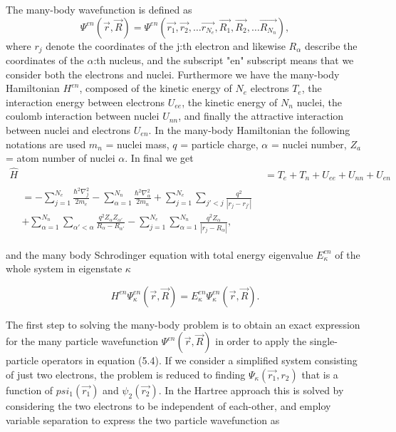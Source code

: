 The many-body wavefunction is defined as
\begin{equation}
\Psi^{en}(\vec{r}, \vec{R}) = \Psi^{en}(\vec{r_1}, \vec{r_2}, \dots \vec{r_{N_e}}, \vec{R_1}, \vec{R_2}, \dots \vec{R_{N_n}}),
\end{equation}
 where $r_j$ denote the coordinates of the j:th electron and likewise $R_{\alpha}$ describe the coordinates of the $\alpha$:th nucleus, and the subscript "en" subscript means that we consider both the electrons and nuclei. Furthermore we have the many-body Hamiltonian $H^{en}$, composed of the kinetic energy of $N_e$ electrons $T_e$, the interaction energy between electrons $U_{ee}$, the kinetic energy of $N_n$ nuclei, the coulomb interaction between nuclei $U_{nn}$, and finally the attractive interaction between nuclei and electrons $U_{en}$. In the many-body Hamiltonian the following notations are used $m_n$ = nuclei mass, $q$ = particle charge, $\alpha$ = nuclei number, $Z_a$ = atom number of nuclei $\alpha$. In final we get 
\begin{align}
    \hat{H} &= T_e + T_n + U_{ee} + U_{nn} + U_{en} \\
    \begin{split}
        &= -\sum_{j=1}^{N_e}\frac{\hbar^2\nabla_j ^2}{2m_e} - \sum_{\alpha=1}^{N_n}\frac{\hbar^2 \nabla_\alpha ^2}{2m_n} + \sum_{j=1}^{N_e}\sum_{j'<j}\frac{q^2}{|r_j - r_{j'}|} \\
    &+ \sum_{\alpha=1}^{N_n}\sum_{\alpha' < \alpha}\frac{q^2Z_\alpha Z_{\alpha'}}{R_\alpha - R_{\alpha'}} -\sum_{j=1}^{N_e}\sum_{\alpha=1}^{N_n}\frac{q^2Z_\alpha}{|r_j - R_\alpha|},
    \end{split}
\end{align} 
 
and the many body Schrodinger equation with total energy eigenvalue $E_{\kappa}^{en}$ of the whole system in eigenstate $\kappa$
 
\begin{equation}
H^{en}\Psi^{en}_{\kappa}(\vec{r}, \vec{R}) = E_{\kappa}^{en}\Psi_{\kappa}^{en}(\vec{r}, \vec{R}).
\end{equation}

The first step to solving the many-body problem is to obtain an exact expression for the many particle wavefunction $\Psi^{en}(\vec{r}, \vec{R})$ in order to apply the single-particle operators in equation (5.4). If we consider a simplified system consisting of just two electrons, the problem is reduced to finding $\Psi_{\kappa}(\vec{r_1}, r_2)$ that is a function of $psi_1(\vec{r_1})$ and $\psi_2(\vec{r_2})$. In the Hartree approach this is solved by considering the two electrons to be independent of each-other, and employ variable separation to express the two particle wavefunction as


